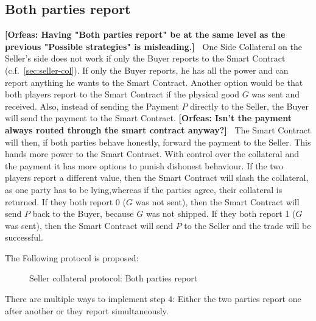 \documentclass{cacthesis}
\newcommand{\authnote}[3]{{ \footnotesize \textbf{#1[#2: #3]~}}}
\newcommand{\orfnote}[1]{\authnote{\color{blue}}{Orfeas}{#1}}
\begin{document}
\subsection{Both parties report}
\orfnote{Having "Both parties report" be at the same level as the previous
"Possible strategies" is misleading.}
One Side Collateral on the Seller's side does not work if only the Buyer reports
to the Smart Contract (c.f.~\ref{sec:seller-col}). If only the Buyer reports, he has all the power and can report anything he wants to the Smart Contract.
Another option would be that both players report to the Smart Contract if the physical good $G$ was sent and received.
Also, instead of sending the Payment $P$ directly to the Seller, the Buyer will
send the payment to the Smart Contract. \orfnote{Isn't the payment always routed
through the smart contract anyway?} The Smart Contract will then, if both parties behave honestly, forward the payment to the Seller. This hands more power to the Smart Contract. With control over the collateral and the payment it has more options to punish dishonest behaviour. 
If the two players report a different value, then the Smart Contract will slash
the collateral, as one party has to be lying,whereas if the parties
agree, their collateral is returned. If they both report 0 ($G$ was not sent),
then the Smart Contract will send $P$ back to the Buyer, because $G$ was not
shipped. If they both report 1 ($G$ was sent), then the Smart Contract will send
$P$ to the Seller and the trade will be successful.\newline

The Following protocol is proposed:
\begin{figure}[htb!]
    \centering
    \caption{Seller collateral protocol: Both parties report}
    \label{pro:seller-col-both-report}
\end{figure}

There are multiple ways to implement step 4: Either the two parties report one after another or they report simultaneously.
\end{document}
